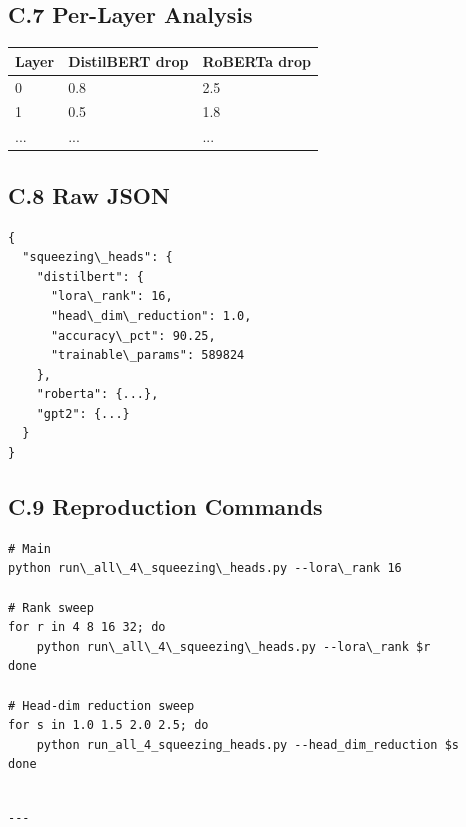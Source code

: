 \subsection{C.7 Per-Layer Analysis}

\begin{table}[H]
\centering
\small
\begin{tabular}{lll}
\toprule
\textbf{Layer} & \textbf{DistilBERT drop} & \textbf{RoBERTa drop} \\
\midrule
0 & 0.8 & 2.5 \\
1 & 0.5 & 1.8 \\
... & ... & ... \\
\bottomrule
\end{tabular}
\end{table}

\subsection{C.8 Raw JSON}

\begin{lstlisting}
{
  "squeezing\_heads": {
    "distilbert": {
      "lora\_rank": 16,
      "head\_dim\_reduction": 1.0,
      "accuracy\_pct": 90.25,
      "trainable\_params": 589824
    },
    "roberta": {...},
    "gpt2": {...}
  }
}
\end{lstlisting}

\subsection{C.9 Reproduction Commands}

\begin{lstlisting}
# Main
python run\_all\_4\_squeezing\_heads.py --lora\_rank 16

# Rank sweep
for r in 4 8 16 32; do
    python run\_all\_4\_squeezing\_heads.py --lora\_rank $r
done

# Head-dim reduction sweep
for s in 1.0 1.5 2.0 2.5; do
    python run_all_4_squeezing_heads.py --head_dim_reduction $s
done
\end{lstlisting}
\begin{lstlisting}

---
\end{lstlisting}